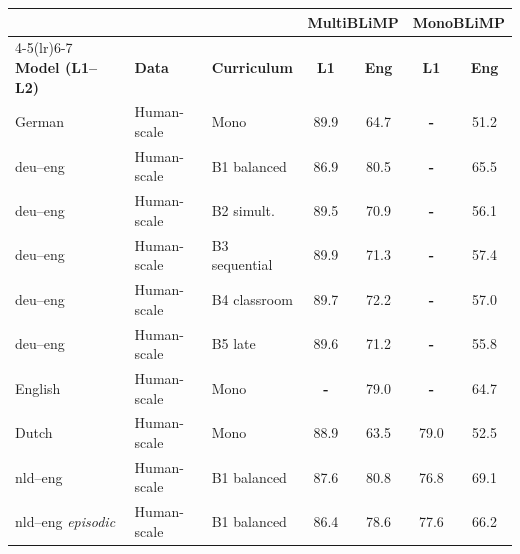 \newpage
\begin{table}[t]
\centering\small
\setlength{\tabcolsep}{4pt}
\begin{tabular}{lll cc cc}
\toprule
& & & \multicolumn{2}{c}{\textbf{MultiBLiMP}} & \multicolumn{2}{c}{\textbf{MonoBLiMP}} \\
\cmidrule(lr){4-5}\cmidrule(lr){6-7}
\textbf{Model (L1--L2)} & \textbf{Data} & \textbf{Curriculum} & \textbf{L1} & \textbf{Eng} & \textbf{L1} & \textbf{Eng} \\
\midrule
German & Human-scale & Mono & \cellcolor[rgb]{0.779,1.000,0.779} 89.9 & \cellcolor[rgb]{0.920,1.000,0.920} 64.7 & \textbf{-} & \cellcolor[rgb]{0.990,1.000,0.990} 51.2 \\
deu--eng & Human-scale & B1 balanced & \cellcolor[rgb]{0.796,1.000,0.796} 86.9 & \cellcolor[rgb]{0.834,1.000,0.834} 80.5 & \textbf{-} & \cellcolor[rgb]{0.872,1.000,0.872} 65.5 \\
deu--eng & Human-scale & B2 simult. & \cellcolor[rgb]{0.781,1.000,0.781} 89.5 & \cellcolor[rgb]{0.886,1.000,0.886} 70.9 & \textbf{-} & \cellcolor[rgb]{0.950,1.000,0.950} 56.1 \\
deu--eng & Human-scale & B3 sequential & \cellcolor[rgb]{0.779,1.000,0.779} 89.9 & \cellcolor[rgb]{0.884,1.000,0.884} 71.3 & \textbf{-} & \cellcolor[rgb]{0.939,1.000,0.939} 57.4 \\
deu--eng & Human-scale & B4 classroom & \cellcolor[rgb]{0.780,1.000,0.780} 89.7 & \cellcolor[rgb]{0.879,1.000,0.879} 72.2 & \textbf{-} & \cellcolor[rgb]{0.942,1.000,0.942} 57.0 \\
deu--eng & Human-scale & B5 late & \cellcolor[rgb]{0.781,1.000,0.781} 89.6 & \cellcolor[rgb]{0.884,1.000,0.884} 71.2 & \textbf{-} & \cellcolor[rgb]{0.952,1.000,0.952} 55.8 \\
English & Human-scale & Mono & \textbf{-} & \cellcolor[rgb]{0.842,1.000,0.842} 79.0 & \textbf{-} & \cellcolor[rgb]{0.879,1.000,0.879} 64.7 \\
Dutch & Human-scale & Mono & \cellcolor[rgb]{0.785,1.000,0.785} 88.9 & \cellcolor[rgb]{0.926,1.000,0.926} 63.5 & \cellcolor[rgb]{0.794,1.000,0.794} 79.0 & \cellcolor[rgb]{0.979,1.000,0.979} 52.5 \\
nld--eng & Human-scale & B1 balanced & \cellcolor[rgb]{0.792,1.000,0.792} 87.6 & \cellcolor[rgb]{0.832,1.000,0.832} 80.8 & \cellcolor[rgb]{0.810,1.000,0.810} 76.8 & \cellcolor[rgb]{0.843,1.000,0.843} 69.1 \\
nld--eng {\scriptsize\textit{episodic}} & Human-scale & B1 balanced & \cellcolor[rgb]{0.799,1.000,0.799} 86.4 & \cellcolor[rgb]{0.844,1.000,0.844} 78.6 & \cellcolor[rgb]{0.804,1.000,0.804} 77.6 & \cellcolor[rgb]{0.867,1.000,0.867} 66.2 \\

\end{tabular}
\end{table}
